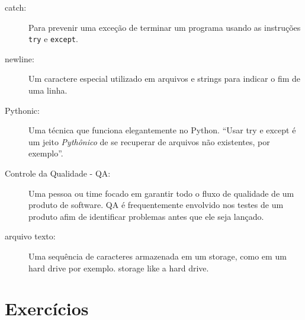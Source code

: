 \begin{description}

\item[catch:] Para prevenir uma exceção de terminar um programa
usando as instruções {\tt try} e {\tt except}.

\item[newline:] Um caractere especial utilizado em arquivos e strings
para indicar o fim de uma linha.

\item[Pythonic:] Uma técnica que funciona elegantemente no Python.
``Usar try e except é um jeito \emph{Pythônico} de se recuperar de 
arquivos não existentes, por exemplo''.

\item[Controle da Qualidade - QA:] Uma pessoa ou time focado em 
garantir todo o fluxo de qualidade de um produto de software. QA é
frequentemente envolvido nos testes de um produto afim de identificar
problemas antes que ele seja lançado.

\item[arquivo texto:] Uma sequência de caracteres armazenada em
um storage, como em um hard drive por exemplo.
storage like a hard drive.

\end{description}


\section{Exercícios}


